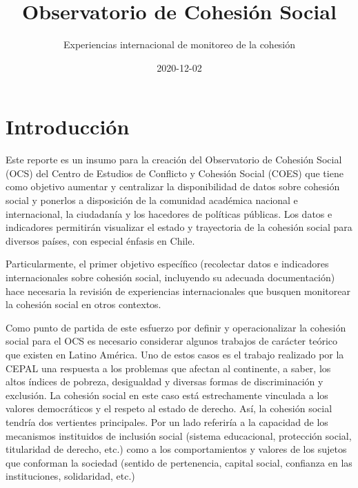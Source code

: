 \documentclass[
  12pt,
]{book}
\title{Observatorio de Cohesión Social}
\subtitle{Experiencias internacional de monitoreo de la cohesión}
\author{}
\date{\vspace{-2.5em}2020-12-02}
\begin{document}
\maketitle

	

{
\setcounter{tocdepth}{1}
\tableofcontents
}
\listoftables
\listoffigures
{}
\hypertarget{introducciuxf3n}{%
\chapter{Introducción}\label{introducciuxf3n}}

Este reporte es un insumo para la creación del Observatorio de Cohesión
Social (OCS) del Centro de Estudios de Conflicto y Cohesión Social
(COES) que tiene como objetivo aumentar y centralizar la disponibilidad
de datos sobre cohesión social y ponerlos a disposición de la comunidad
académica nacional e internacional, la ciudadanía y los hacedores de
políticas públicas. Los datos e indicadores permitirán visualizar el
estado y trayectoria de la cohesión social para diversos países, con
especial énfasis en Chile.

Particularmente, el primer objetivo específico (recolectar datos e
indicadores internacionales sobre cohesión social, incluyendo su
adecuada documentación) hace necesaria la revisión de experiencias
internacionales que busquen monitorear la cohesión social en otros
contextos.

Como punto de partida de este esfuerzo por definir y operacionalizar la
cohesión social para el OCS es necesario considerar algunos trabajos de
carácter teórico que existen en Latino América. Uno de estos casos es el
trabajo realizado por la CEPAL \citep{ottone2007cohesion} una respuesta a los
problemas que afectan al continente, a saber, los altos índices de
pobreza, desigualdad y diversas formas de discriminación y exclusión. La
cohesión social en este caso está estrechamente vinculada a los valores
democráticos y el respeto al estado de derecho. Así, la cohesión social
tendría dos vertientes principales. Por un lado referiría a la capacidad
de los mecanismos instituidos de inclusión social (sistema educacional,
protección social, titularidad de derecho, etc.) como a los
comportamientos y valores de los sujetos que conforman la sociedad
(sentido de pertenencia, capital social, confianza en las instituciones,
solidaridad, etc.)
\end{document}
